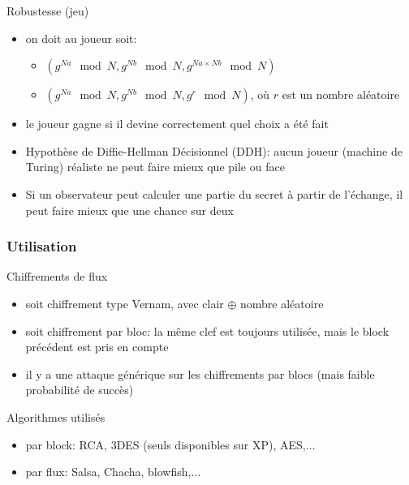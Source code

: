 \begin{reveals}
\begin{frame}
  \begin{block}{Robustesse (jeu)}
    \begin{itemize}
    \item on doit au joueur soit:
      \begin{itemize}
      \item \((g^{Na} \mod N,g^{Nb} \mod N,g^{Na\times Nb} \mod N)\)
      \item \((g^{Na} \mod N,g^{Nb} \mod N,g^{r} \mod N)\), où \(r\)
        est un nombre aléatoire
      \end{itemize}
    \item le joueur gagne si il devine correctement quel choix a été
      fait
    \item Hypothèse de Diffie-Hellman Décisionnel (DDH): aucun joueur
      (machine de Turing) réaliste ne peut faire mieux que pile ou
      face
    \item Si un observateur peut calculer une partie du secret à
      partir de l'échange, il peut faire mieux que une chance sur deux
    \end{itemize}
  \end{block}

  \vfill

\end{frame}

\begin{frame}
  \frametitle{Utilisation}

  \vfill

  \begin{block}{Chiffrements de flux}
    \begin{itemize}
    \item soit chiffrement type Vernam, avec clair \(\oplus\) nombre
      aléatoire
    \item soit chiffrement par bloc: la même clef est toujours
      utilisée, mais le block précédent est pris en compte
    \item il y a une attaque générique sur les chiffrements par blocs
      (mais faible probabilité de succès)
    \end{itemize}
  \end{block}

  \vfill
  \begin{block}{Algorithmes utilisés}
    \begin{itemize}
    \item par block: RCA, 3DES (seuls disponibles sur XP),
      AES,\(\ldots\)
    \item par flux: Salsa, Chacha, blowfish,\(\ldots\)
    \end{itemize}
  \end{block}


\end{frame}
\end{reveals}
